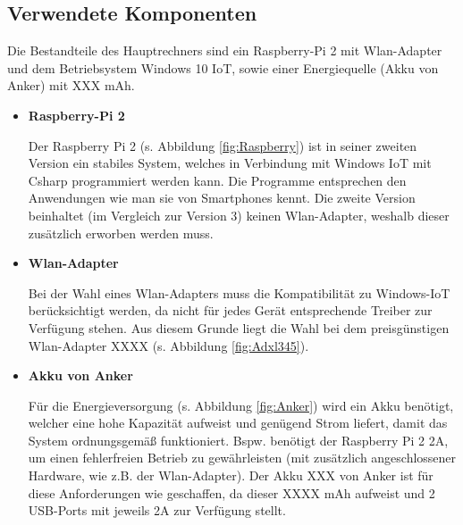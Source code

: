 \subsection{Verwendete Komponenten}
\label{kap:HauptrechnerVerwendeteKomponenten}
Die Bestandteile des Hauptrechners sind ein Raspberry-Pi 2 mit Wlan-Adapter und dem Betriebsystem Windows 10 IoT, sowie einer Energiequelle (Akku von Anker) mit XXX mAh.

\begin{itemize}
	\item \textbf{Raspberry-Pi 2}
	
	Der Raspberry Pi 2 (s. Abbildung \ref{fig:Raspberry}) ist in seiner zweiten Version ein stabiles System, welches in Verbindung mit Windows IoT mit Csharp programmiert werden kann. Die Programme entsprechen den Anwendungen wie man sie von Smartphones kennt.
	\newline
	Die zweite Version beinhaltet (im Vergleich zur Version 3) keinen Wlan-Adapter, weshalb dieser zusätzlich erworben werden muss.
	

	\item \textbf{Wlan-Adapter}
	
	Bei der Wahl eines Wlan-Adapters muss die Kompatibilität zu Windows-IoT berücksichtigt werden, da nicht für jedes Gerät entsprechende Treiber zur Verfügung stehen. Aus diesem Grunde liegt die Wahl bei dem preisgünstigen Wlan-Adapter XXXX (s. Abbildung \ref{fig:Adxl345}).
	
	
	\item \textbf{Akku von Anker}
	
	Für die Energieversorgung (s. Abbildung \ref{fig:Anker}) wird ein Akku benötigt, welcher eine hohe Kapazität aufweist und genügend Strom liefert, damit das System ordnungsgemäß funktioniert. Bspw. benötigt der Raspberry Pi 2 2A, um einen fehlerfreien Betrieb zu gewährleisten (mit zusätzlich angeschlossener Hardware, wie z.B. der Wlan-Adapter).  
	\newline
	Der Akku XXX von Anker ist für diese Anforderungen wie geschaffen, da dieser XXXX mAh aufweist und 2 USB-Ports mit jeweils 2A zur Verfügung stellt.
		

	
\end{itemize}